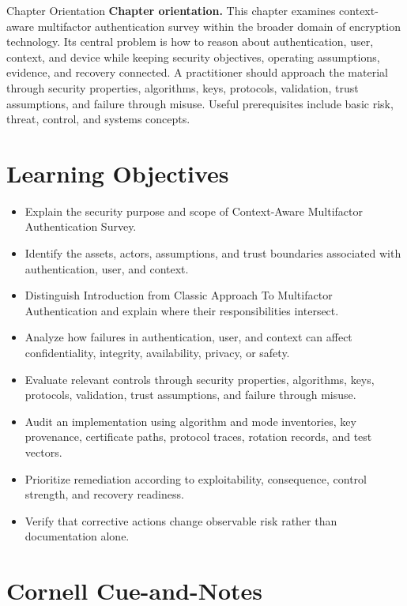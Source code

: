 \documentclass[11pt,letterpaper]{article}
\title{\CornellDocumentTitle}
\author{}
\date{}
\begin{document}
\maketitle
\begin{CornellOverviewBox}{Chapter Orientation}
\textbf{Chapter orientation.} This chapter examines context-aware multifactor authentication survey within the broader domain of encryption technology. Its central problem is how to reason about authentication, user, context, and device while keeping security objectives, operating assumptions, evidence, and recovery connected. A practitioner should approach the material through security properties, algorithms, keys, protocols, validation, trust assumptions, and failure through misuse. Useful prerequisites include basic risk, threat, control, and systems concepts.
\end{CornellOverviewBox}
\section*{Learning Objectives}
\begin{itemize}
\item Explain the security purpose and scope of Context-Aware Multifactor Authentication Survey.
\item Identify the assets, actors, assumptions, and trust boundaries associated with authentication, user, and context.
\item Distinguish Introduction from Classic Approach To Multifactor Authentication and explain where their responsibilities intersect.
\item Analyze how failures in authentication, user, and context can affect confidentiality, integrity, availability, privacy, or safety.
\item Evaluate relevant controls through security properties, algorithms, keys, protocols, validation, trust assumptions, and failure through misuse.
\item Audit an implementation using algorithm and mode inventories, key provenance, certificate paths, protocol traces, rotation records, and test vectors.
\item Prioritize remediation according to exploitability, consequence, control strength, and recovery readiness.
\item Verify that corrective actions change observable risk rather than documentation alone.
\end{itemize}
\section*{Cornell Cue-and-Notes}
\end{document}
